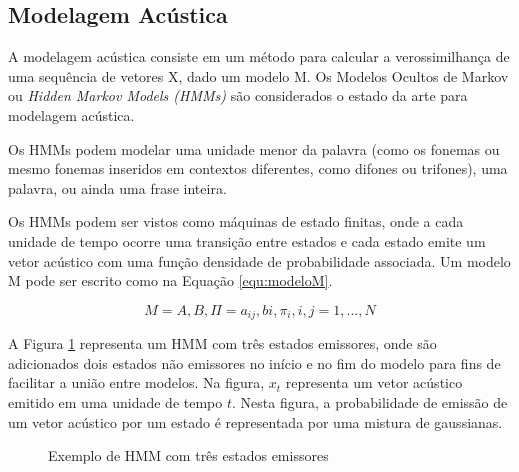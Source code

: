 \documentclass[12pt,a4paper,oneside]{report}
\begin{document}
\subsection{Modelagem Acústica}

A modelagem acústica consiste em um método para calcular a verossimilhança de uma sequência de vetores X, dado um modelo M. Os Modelos Ocultos de Markov ou \emph{Hidden Markov Models (HMMs)} são considerados o estado da arte para modelagem acústica.

Os HMMs podem modelar uma unidade menor da palavra (como os fonemas ou mesmo fonemas inseridos em contextos diferentes, como difones ou trifones), uma palavra, ou ainda uma frase inteira.

Os HMMs podem ser vistos como máquinas de estado finitas, onde a cada unidade de tempo ocorre uma transição entre estados e cada estado emite um vetor acústico com uma função densidade de probabilidade associada. Um modelo M pode ser escrito como na Equação \ref{equ:modeloM}.

\begin{equation}
M = A,B,\Pi = a_{ij} , bi, \pi_{i}, i, j = 1, ...,N
\label{equ:modeloM}
\end{equation}

A Figura \ref{fig:exemploHMM} representa um HMM com três estados emissores, onde são adicionados dois estados não emissores no início e no fim do modelo para fins de facilitar a união entre modelos. Na figura, $x_t$ representa um vetor acústico emitido em uma unidade de tempo $t$. Nesta figura, a probabilidade de emissão de um vetor acústico por um estado é representada por uma mistura de gaussianas.

\begin{figure}[h!]
\centering
{}\caption{Exemplo de HMM com três estados emissores}
\label{fig:exemploHMM}
\end{figure}
\end{document}
